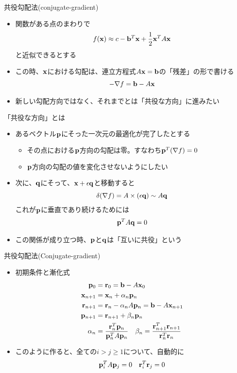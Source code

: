\begin{frame}[t,fragile]{共役勾配法(conjugate-gradient)}
  \begin{itemize}
    \setlength{\itemsep}{1em}
  \item 関数がある点のまわりで
    \[
    f({\bf x}) \approx c - {\bf b}^T {\bf x} + \frac{1}{2} {\bf x}^T A {\bf x}
    \]
    と近似できるとする
  \item この時、${\bf x}$における勾配は、連立方程式$A{\bf x}={\bf b}$の「残差」の形で書ける
    \[
    -\nabla f = {\bf b} - A {\bf x}
    \]
  \item 新しい勾配方向ではなく、それまでとは「共役な方向」に進みたい
  \end{itemize}
\end{frame}

\begin{frame}[t,fragile]{「共役な方向」とは}
  \begin{itemize}
    \setlength{\itemsep}{1em}
  \item あるベクトル${\bf p}$にそった一次元の最適化が完了したとする
    \begin{itemize}
    \item その点における${\bf p}$方向の勾配は零。すなわち${\bf p}^T (\nabla f)=0$
    \item ${\bf p}$方向の勾配の値を変化させないようにしたい
  \end{itemize}
  \item 次に、${\bf q}$にそって、${\bf x}+\epsilon {\bf q}$と移動すると
    \[
      \delta(\nabla f) = A \times (\epsilon {\bf q}) \sim A {\bf q}
      \]
      これが${\bf p}$に垂直であり続けるためには
    \[
      {\bf p}^T A {\bf q} = 0
      \]
    \item この関係が成り立つ時、${\bf p}$と${\bf q}$は「互いに共役」という
  \end{itemize}
\end{frame}

\begin{frame}[t,fragile]{共役勾配法(Conjugate-gradient)}
  \begin{itemize}
    \setlength{\itemsep}{1em}
  \item 初期条件と漸化式
    \begin{align*}
      {\bf p}_0 &= {\bf r}_0 = {\bf b} - A {\bf x}_0 \\
      {\bf x}_{n+1} &= {\bf x}_n + \alpha_n {\bf p}_n \\
      {\bf r}_{n+1} &= {\bf r}_n - \alpha_n A {\bf p}_n = {\bf b} - A {\bf x}_{n+1} \\
      {\bf p}_{n+1} &= {\bf r}_{n+1} + \beta_n {\bf p}_n \\
      \alpha_n &= \frac{{\bf r}_n^T {\bf p}_n}{{\bf p}_n^T A {\bf p}_n} \ \ \
      \beta_n = \frac{{\bf r}_{n+1}^T {\bf r}_{n+1}}{{\bf r}_n^T {\bf r}_n}
    \end{align*}
  \item このように作ると、全ての$i>j \ge 1$について、自動的に
    \[
      {\bf p}_i^T A {\bf p}_j = 0 \ \ \ {\bf r}_i^T {\bf r}_j = 0
      \]
  \end{itemize}
\end{frame}

